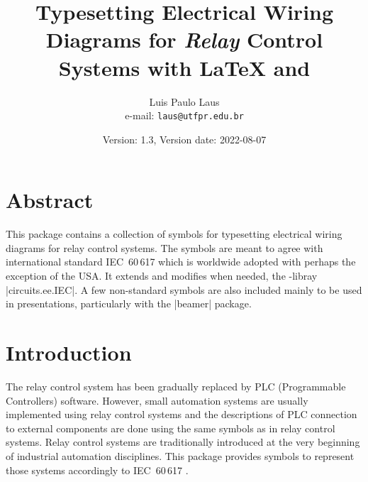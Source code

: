 \documentclass[a4paper]{ltxdoc}
\begin{document}
\title{Typesetting Electrical Wiring Diagrams for \emph{Relay} Control Systems with \LaTeX{} and \tikzname{}}
\author{Luis Paulo Laus\\e-mail: \texttt{laus@utfpr.edu.br}}
\date{Version: 1.3, Version date: 2022-08-07}

\maketitle

\section{Abstract}

This package contains a collection of symbols for typesetting electrical wiring diagrams for relay control systems. The symbols are meant to agree with international standard IEC~60\,617 \cite{60617-2,60617-4,60617-7,60617-8} which is worldwide adopted with perhaps the exception of the USA. It extends and modifies when needed, the \tikzname-libray |circuits.ee.IEC|. A few non-standard symbols are also included mainly to be used in presentations, particularly with the |beamer| package.

\section{Introduction}
The relay control system has been gradually replaced by PLC (Programmable Controllers) software. However, small automation systems are usually implemented using relay control systems and the descriptions of PLC connection to external components are done using the same symbols as in relay control systems. Relay control systems are traditionally introduced at the very beginning of industrial automation disciplines. This package provides symbols to represent those systems accordingly to IEC~60\,617 \cite{60617-2,60617-4,60617-7,60617-8}. 
\end{document}
